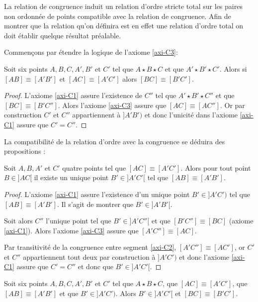 La relation de congruence induit un relation d'ordre stricte total sur les paires non ordonnée de points compatible avec la relation de congruence. Afin de montrer que la relation qu'on définira est en effet une relation d'ordre total on doit établir quelque résultat préalable.

Commençons par étendre la logique de l'axiome \ref{axi-C3}:
\begin{prop}
     Soit six points $A,B,C,A',B'$ et $C'$ tel que $A \star B \star C$ et que $A' \star B' \star C'$. Alors si $[AB]\equiv [A'B']$ et $[AC]\equiv [A'C']$ alors $[BC]\equiv [B'C']$.
\begin{proof}
    L'axiome \ref{axi-C1} assure l'existence de $C''$ tel que $A'\star B' \star C''$ et que $[BC]\equiv [B'C'']$. Alors l'axiome \ref{axi-C3} assure que $[AC]\equiv [AC'']$. Or par construction $C'$ et $C''$ appartiennent à $]A'B')$ et donc l'unicité dans l'axiome \ref{axi-C1} assure que $C'=C''$.
\end{proof}
\end{prop}
La compatibilité de la relation d'ordre avec la congruence se déduira des propositions :
\begin{prop}\label{prop-inegcongcomp}
    Soit $A,B,A'$ et $C'$ quatre points tel que $[AC]\equiv [A'C']$. Alors pour tout point $B\in ]AC[$ il existe un unique point $B'\in ]A'C'[$ tel que $[AB]\equiv [A'B']$.
\begin{proof}
    L'axiome \ref{axi-C1} assure l'existence d'un unique point $B'\in]A'C')$ tel que $[AB] \equiv [A'B']$. Il s'agit de montrer que $B'\in ]A'B'[$. 

    Soit alors $C''$ l'unique point tel que $B'\in]A'C''[$ et que $[B'C'']\equiv[BC]$ (axiome \ref{axi-C1}). Alors l'axiome \ref{axi-C3} assure que $[A'C'']\equiv[AC]$.
    
    Par transitivité de la congruence entre segment \ref{axi-C2}, $[A'C'']\equiv[AC']$, or $C'$ et $C''$ appartiennent tout deux par construction à $]A'C')$ et donc l'axiome \ref{axi-C1} assure que $C'=C''$ et donc que $B'\in]A'C'[$.
\end{proof}
\end{prop}
\begin{cor}\label{cor-dedanssipluspetit}
    Soit six points $A,B,C,A',B'$ et $C'$ tel que $A \star B \star C$, que $[AC]\equiv [A'C']$, que $[AB]\equiv [A'B']$ et que $B'\in ]A'C')$. Alors $B' \in ]A'C'[$ et $[BC]\equiv [B' C']$. 
\end{cor}
